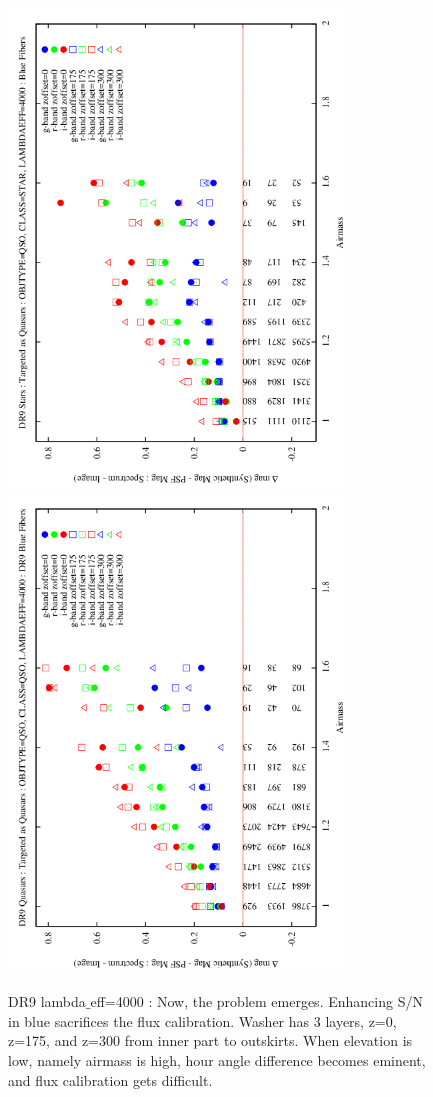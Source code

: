\documentclass[apj,twocolumn]{aastex631}
\begin{document}
\begin{figure}%
\begin{center}
\includegraphics[angle=270,width=8.9cm]{figures/120821_03_airmass_vs_dmag_star_dr9_bluefiber.png}
\includegraphics[angle=270,width=8.9cm]{figures/120821_06_airmass_vs_dmag_quasar_dr9_bluefiber.png}
\caption{DR9 lambda$\_$eff=4000 : Now, the problem emerges. Enhancing S/N in blue sacrifices the flux calibration.  Washer has 3 layers, z=0, z=175, and z=300 from inner part to outskirts.  When elevation is low, namely airmass is high, hour angle difference becomes eminent, and flux calibration gets difficult.}
\end{center}
\end{figure}
\end{document}
